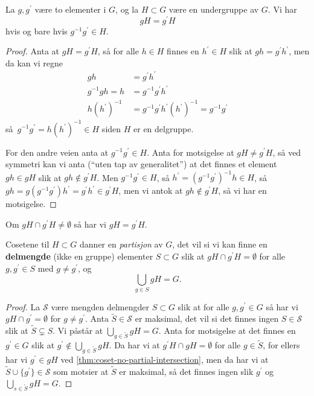 \begin{lemma}
    La $g, g^\prime$ være to elementer i $G$,
    og la $H\subset G$ være en undergruppe av $G$.
    Vi har
    \[
        gH = g^\prime H
    \]
    hvis og bare hvis $g^{-1} g^\prime\in H$.
\end{lemma}
\begin{proof}
    Anta at $g H = g^\prime H$,
    så for alle $h\in H$ finnes en $h^\prime\in H$
    slik at $gh = g^\prime h^\prime$,
    men da kan vi regne
    \[\begin{aligned}
        gh &= g^\prime h^\prime \\
        g^{-1} gh = h
           &= g^{-1} g^\prime h^\prime \\
        h {(h^\prime)}^{-1}
           &= g^{-1} g^\prime h^\prime {(h^\prime)}^{-1}
            = g^{-1} g^\prime
    \end{aligned}\]
    så $g^{-1}g^\prime = h {(h^\prime)}^{-1}\in H$ siden $H$ er en delgruppe.

    For den andre veien anta at $g^{-1} g^\prime \in H$.
    Anta for motsigelse at $gH\neq g^\prime H$,
    så ved symmetri kan vi anta (``uten tap av generalitet'')
    at det finnes et element $gh\in gH$
    slik at $gh\notin g^\prime H$.
    Men $g^{-1} g^\prime \in H$,
    så $h^\prime = {(g^{-1} g^\prime)}^{-1} h\in H$,
    så $gh = g (g^{-1}g^\prime) h^\prime = g^\prime h^\prime \in g^\prime H$,
    men vi antok at $gh\notin g^\prime H$, så vi har en motsigelse.
\end{proof}

\begin{corollary}\label{thm:coset-no-partial-intersection}
    Om $gH\cap g^\prime H\neq \emptyset$ så har vi $gH = g^\prime H$.
\end{corollary}

\begin{corollary}
    Cosetene til $H\subset G$ danner en \textit{partisjon} av $G$,
    det vil si vi kan finne en \textbf{delmengde} (ikke en gruppe) elementer
    $S\subset G$ slik at $gH \cap g^\prime H = \emptyset$ for alle $g,g^\prime\in S$
    med $g\neq g^\prime$, og
    \[
        \bigcup_{g\in S} gH = G.
    \]
\end{corollary}
\begin{proof}
    La $\mathcal S$ være mengden delmengder $S\subset G$ slik at
    for alle $g,g^\prime \in G$ så har vi $gH\cap g^\prime = \emptyset$
    for $g\neq g^\prime$.
    Anta $\tilde S\in \mathcal S$ er maksimal, det vil si det finnes ingen
    $S\in \mathcal S$ slik at $\tilde S\subsetneq S$.
    Vi påstår at $\bigcup_{g\in \tilde S} gH = G$.
    Anta for motsigelse at det finnes en $g^\prime\in G$ slik at
    $g^\prime\notin \bigcup_{g\in \tilde S} gH$.
    Da har vi at $g^\prime H\cap gH = \emptyset$ for alle $g\in \tilde S$,
    for ellers har vi $g^\prime \in gH$ ved \cref{thm:coset-no-partial-intersection},
    men da har vi at $\tilde S\cup \{g^\prime\}\in\mathcal S$
    som motsier at $\tilde S$ er maksimal,
    så det finnes ingen slik $g^\prime$ og $\bigcup_{s\in\tilde S} gH = G$.
\end{proof}

